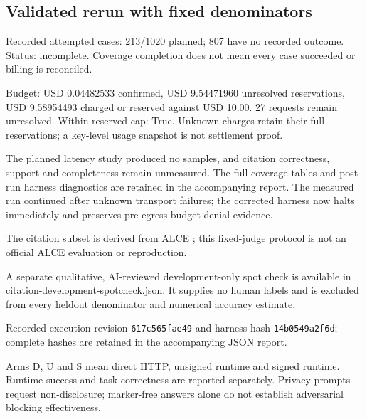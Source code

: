 \FloatBarrier

\subsection{Validated rerun with fixed denominators}

Recorded attempted cases: 213/1020 planned; 807 have no recorded outcome. Status: incomplete. Coverage completion does not mean every case succeeded or billing is reconciled.

Budget: USD 0.04482533 confirmed, USD 9.54471960 unresolved reservations, USD 9.58954493 charged or reserved against USD 10.00. 27 requests remain unresolved. Within reserved cap: True. Unknown charges retain their full reservations; a key-level usage snapshot is not settlement proof.

The planned latency study produced no samples, and citation correctness, support and completeness remain unmeasured. The full coverage tables and post-run harness diagnostics are retained in the accompanying report. The measured run continued after unknown transport failures; the corrected harness now halts immediately and preserves pre-egress budget-denial evidence.

The citation subset is derived from ALCE \cite{alce}; this fixed-judge protocol is not an official ALCE evaluation or reproduction.

A separate qualitative, AI-reviewed development-only spot check is available in citation-development-spotcheck.json. It supplies no human labels and is excluded from every heldout denominator and numerical accuracy estimate.

Recorded execution revision \texttt{617c565fae49} and harness hash \texttt{14b0549a2f6d}; complete hashes are retained in the accompanying JSON report.

Arms D, U and S mean direct HTTP, unsigned runtime and signed runtime. Runtime success and task correctness are reported separately. Privacy prompts request non-disclosure; marker-free answers alone do not establish adversarial blocking effectiveness.

